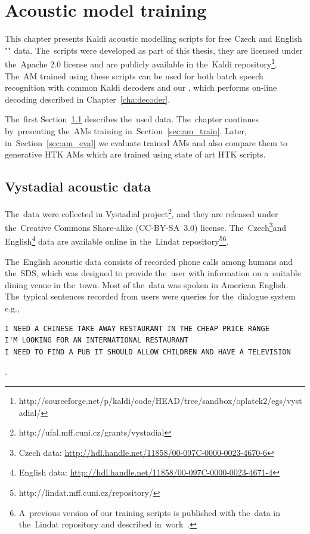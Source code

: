 \chapter{Acoustic model training}
\label{cha:train}

This chapter presents Kaldi acoustic modelling scripts for free Czech and English "" data.
The~scripts were developed as part of this thesis, they are licensed under the~Apache 2.0 license and are publicly available in the~Kaldi repository\footnote{http://sourceforge.net/p/kaldi/code/HEAD/tree/sandbox/oplatek2/egs/vystadial/}.
The~\acf{AM} trained using these scripts can be used for both batch speech recognition with common Kaldi decoders and our , which performs on-line decoding described in Chapter~\ref{cha:decoder}.

The~first Section~\ref{sec:data} describes the~used data. 
The~chapter continues by~presenting the~\acp{AM} training in~Section~\ref{sec:am_train}. 
Later, in~Section~\ref{sec:am_eval} we evaluate trained \acp{AM} and also compare them to generative \ac{HTK} \acp{AM} which are trained using state of art \ac{HTK} scripts.

\section{Vystadial acoustic data}
\label{sec:data}

The~data were collected in Vystadial project\footnote{http://ufal.mff.cuni.cz/grants/vystadial}, and they are released under the~Creative Commons Share-alike (CC-BY-SA~3.0) license. 
The~Czech\footnote{Czech data: \url{http://hdl.handle.net/11858/00-097C-0000-0023-4670-6}}and English\footnote{English data: \url{http://hdl.handle.net/11858/00-097C-0000-0023-4671-4}} data are available online in the~Lindat repository\footnote{{http://lindat.mff.cuni.cz/repository/}}\footnote{A~previous version of our training scripts is published with the~data in the~Lindat repository and described in~work~\cite{korvas_2014}.}.

The~English acoustic data consists of recorded phone calls among humans and the~\acl{SDS}, which was designed to provide the~user with information on a~suitable dining venue in the~town.
Most of the~data was spoken in American English.
The~typical sentences recorded from users were queries for the~dialogue system e.g.,
\begin{verbatim}
I NEED A CHINESE TAKE AWAY RESTAURANT IN THE CHEAP PRICE RANGE
I'M LOOKING FOR AN INTERNATIONAL RESTAURANT
I NEED TO FIND A PUB IT SHOULD ALLOW CHILDREN AND HAVE A TELEVISION
\end{verbatim}.

